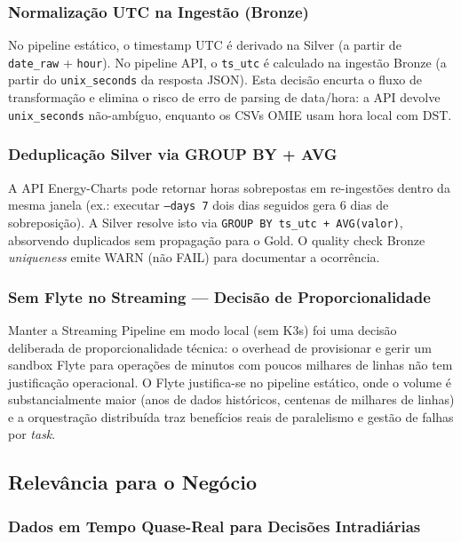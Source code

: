 \documentclass[11pt,a4paper]{article}
\begin{document}
\subsubsection{Normalização UTC na Ingestão (Bronze)}

No pipeline estático, o timestamp UTC é derivado na Silver (a partir de \texttt{date\_raw} + \texttt{hour}). No pipeline API, o \texttt{ts\_utc} é calculado na ingestão Bronze (a partir do \texttt{unix\_seconds} da resposta JSON). Esta decisão encurta o fluxo de transformação e elimina o risco de erro de parsing de data/hora: a API devolve \texttt{unix\_seconds} não-ambíguo, enquanto os CSVs OMIE usam hora local com DST.

\subsubsection{Deduplicação Silver via GROUP BY + AVG}

A API Energy-Charts pode retornar horas sobrepostas em re-ingestões dentro da mesma janela (ex.: executar \texttt{--days 7} dois dias seguidos gera 6 dias de sobreposição). A Silver resolve isto via \texttt{GROUP BY ts\_utc + AVG(valor)}, absorvendo duplicados sem propagação para o Gold. O quality check Bronze \textit{uniqueness} emite WARN (não FAIL) para documentar a ocorrência.

\subsubsection{Sem Flyte no Streaming — Decisão de Proporcionalidade}

Manter a Streaming Pipeline em modo local (sem K3s) foi uma decisão deliberada de proporcionalidade técnica: o overhead de provisionar e gerir um sandbox Flyte para operações de minutos com poucos milhares de linhas não tem justificação operacional. O Flyte justifica-se no pipeline estático, onde o volume é substancialmente maior (anos de dados históricos, centenas de milhares de linhas) e a orquestração distribuída traz benefícios reais de paralelismo e gestão de falhas por \textit{task}.

\subsection{Relevância para o Negócio}

\subsubsection{Dados em Tempo Quase-Real para Decisões Intradiárias}
\end{document}
